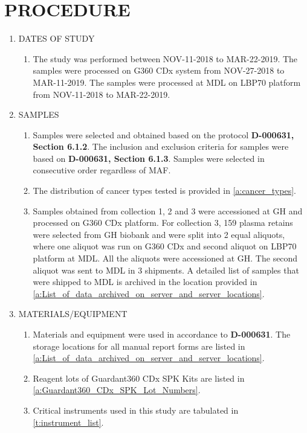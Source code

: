 \documentclass[12pt]{protocol}
\begin{document}
\section{PROCEDURE}

\begin{enumerate}
	\item DATES OF STUDY
	    \begin{enumerate}
            \item The study was performed between NOV-11-2018 to MAR-22-2019. The samples were
                processed on G360 CDx system from NOV-27-2018 to MAR-11-2019. The samples were
                processed at MDL on LBP70 platform from NOV-11-2018 to MAR-22-2019.
	    \end{enumerate}
    \item SAMPLES
        \begin{enumerate}
            \item Samples were selected and obtained based on the protocol \textbf{D-000631,
                Section 6.1.2}. The inclusion and exclusion criteria for samples were based on
                \textbf{D-000631, Section 6.1.3}. Samples were selected in consecutive order
                regardless of MAF.
            \item The distribution of cancer types tested is provided in \cref{a:cancer_types}.
            \item Samples obtained from collection 1, 2 and 3 were accessioned at GH and processed
                on G360 CDx platform. For collection 3, 159 plasma retains were selected from GH
                biobank and were split into 2 equal aliquots, where one aliquot was run on G360 CDx
                and second aliquot on LBP70 platform at MDL. All the aliquots were accessioned at
                GH. The second aliquot was sent to MDL in 3 shipments. A detailed list of samples
                that were shipped to MDL is archived in the location provided in
                \cref{a:List_of_data_archived_on_server_and_server_locations}.               
    	\end{enumerate}
	\item MATERIALS/EQUIPMENT
    \begin{enumerate}
        \item Materials and equipment were used in accordance to \textbf{D-000631}. The storage
            locations for all manual report forms are listed in
            \cref{a:List_of_data_archived_on_server_and_server_locations}.
    	\item Reagent lots of Guardant360 CDx SPK Kits are listed in \cref{a:Guardant360_CDx_SPK_Lot_Numbers}.
    	\item Critical instruments used in this study are tabulated in \cref{t:instrument_list}.
\end{enumerate}
	

\end{enumerate}
\end{document}

